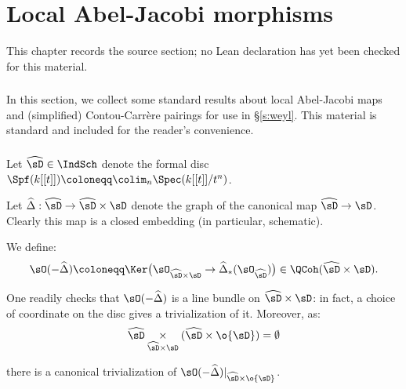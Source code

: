 \chapter{Local Abel-Jacobi morphisms}
\label{tates-thesis-de-rham-setting-chapter-03}

\begin{remark}
\label{tates-thesis-de-rham-setting-chapter-03-source}
This chapter records the source section; no Lean declaration has yet been checked for this material.
\notready
\end{remark}

\label{s:aj}

\subsection{}

In this section, we collect some standard results
about local Abel-Jacobi maps and (simplified)
Contou-Carr\`ere pairings for use in \S \ref{s:weyl}.
This material is standard and included for the reader's
convenience.

\subsection{}

Let $\widehat{\sD} \in \IndSch$ denote the formal disc
$\Spf(k[[t]]) \coloneqq \colim_n \Spec(k[[t]]/t^n)$.

Let $\widehat{\Delta}:\widehat{\sD} \to \widehat{\sD} \times \sD$ denote the
graph of the canonical map $\widehat{\sD} \to \sD$.
Clearly this map is a closed embedding (in particular, schematic).

We define:
%
\[
\sO(-\widehat{\Delta}) \coloneqq \Ker\big(
\sO_{\widehat{\sD} \times \sD} \to \widehat{\Delta}_*(\sO_{\widehat{\sD}})\big)
\in \QCoh(\widehat{\sD} \times \sD).
\]

 One readily checks
that $\sO(-\widehat{\Delta})$ is a line bundle on
$\widehat{\sD} \times \sD$: in fact,
a choice of coordinate on the disc
gives a trivialization of it.
Moreover, as:
%
\[
\widehat{\sD}
\underset{\widehat{\sD} \times \sD }{\times}
(\widehat{\sD} \times \o{\sD} ) = \emptyset
\]

 there is a canonical trivialization
of
$\sO(-\widehat{\Delta})|_{\widehat{\sD} \times \o{\sD}}$.

